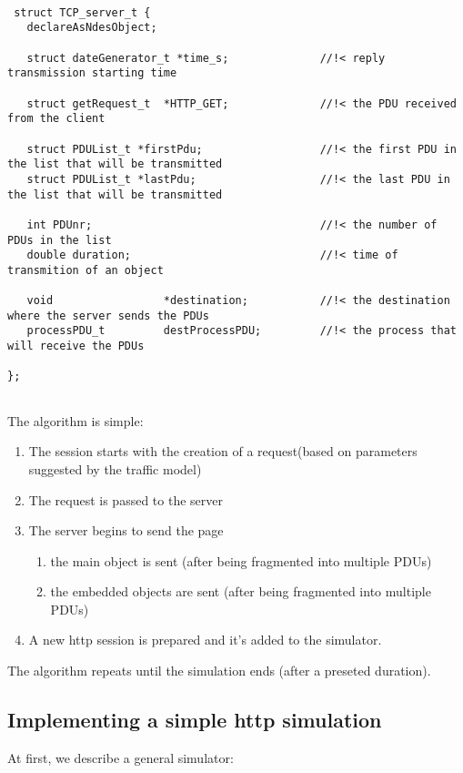 \begin{verbatim}

 struct TCP_server_t {
   declareAsNdesObject;

   struct dateGenerator_t *time_s;              //!< reply transmission starting time

   struct getRequest_t  *HTTP_GET;              //!< the PDU received from the client

   struct PDUList_t *firstPdu;                  //!< the first PDU in the list that will be transmitted
   struct PDUList_t *lastPdu;                   //!< the last PDU in the list that will be transmitted

   int PDUnr;                                   //!< the number of PDUs in the list
   double duration;                             //!< time of transmition of an object

   void                 *destination;           //!< the destination where the server sends the PDUs
   processPDU_t         destProcessPDU;         //!< the process that will receive the PDUs

};


\end{verbatim}
 
 The algorithm is simple:
 \begin{enumerate}
  \item The session starts with the creation of a request(based on parameters suggested by the traffic model)    
  \item The request is passed to the server
  \item The server begins to send the page
         \begin{enumerate}
          \item the main object is sent (after being fragmented into multiple PDUs)
          \item the embedded objects are sent (after being fragmented into multiple PDUs)
         \end{enumerate}
  \item A new http session is prepared and it's added to the simulator. 
 \end{enumerate}
 
 The algorithm repeats until the simulation ends (after a preseted duration).


\subsection{Implementing a simple http simulation}
At first, we describe a general simulator:

